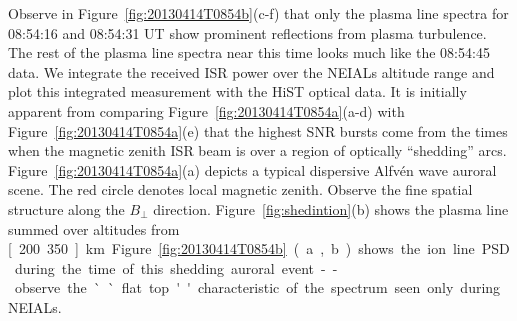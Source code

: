 Observe in Figure~\ref{fig:20130414T0854b}(c-f) that only the plasma line spectra for 08:54:16 and 08:54:31 UT show prominent reflections from plasma turbulence.
The rest of the plasma line spectra near this time looks much like the 08:54:45 data.
We integrate the received ISR power over the NEIALs altitude range and plot this integrated measurement with the HiST optical data. 
It is initially apparent from comparing Figure~\ref{fig:20130414T0854a}(a-d) with Figure~\ref{fig:20130414T0854a}(e) that the highest SNR bursts come from the times when the magnetic zenith ISR beam is over a region of optically ``shedding'' arcs.
Figure~\ref{fig:20130414T0854a}(a) depicts a typical dispersive Alfvén wave auroral scene. 
The red circle denotes local magnetic zenith. 
Observe the fine spatial structure along the $B_\perp$ direction. 
Figure~\ref{fig:shedintion}(b) shows the plasma line summed over altitudes from \unit[200..350]{km}.
Figure~\ref{fig:20130414T0854b}(a,b) shows the ion line PSD during the time of this shedding auroral event--observe the ``flat top'' characteristic of the spectrum seen only during NEIALs.

